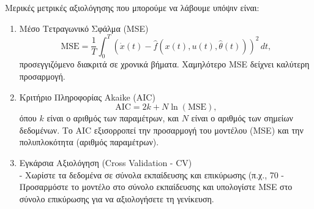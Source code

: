 \documentclass[12pt]{article} %
\numberwithin{equation}{section}  %
\begin{document}
Μερικές μετρικές αξιολόγησης που μπορούμε να λάβουμε υπόψιν είναι:
\begin{enumerate}
    \item Μέσο Τετραγωνικό Σφάλμα (MSE) \\
        \[
        \text{MSE} = \frac{1}{T} \int_0^T (\dot{x}(t) - \hat{f}(x(t), u(t), \hat{\theta}(t)))^2 \, dt,
        \]
        προσεγγιζόμενο διακριτά σε χρονικά βήματα. Χαμηλότερο MSE δείχνει καλύτερη προσαρμογή.
    
    \item Κριτήριο Πληροφορίας Akaike (AIC) \\
        \[
        \text{AIC} = 2k + N \ln(\text{MSE}),
        \]
        όπου \(k\) είναι ο αριθμός των παραμέτρων, και \(N\) είναι ο αριθμός των σημείων δεδομένων. Το AIC εξισορροπεί την προσαρμογή του μοντέλου (MSE) και την πολυπλοκότητα (αριθμός παραμέτρων).
        
    \item Εγκάρσια Αξιολόγηση (Cross Validation - CV) \\
       - Χωρίστε τα δεδομένα σε σύνολα εκπαίδευσης και επικύρωσης (π.χ., 70%
   - Προσαρμόστε το μοντέλο στο σύνολο εκπαίδευσης και υπολογίστε MSE στο σύνολο επικύρωσης για να αξιολογήσετε τη γενίκευση.
\end{enumerate}



\newpage
\end{document}
